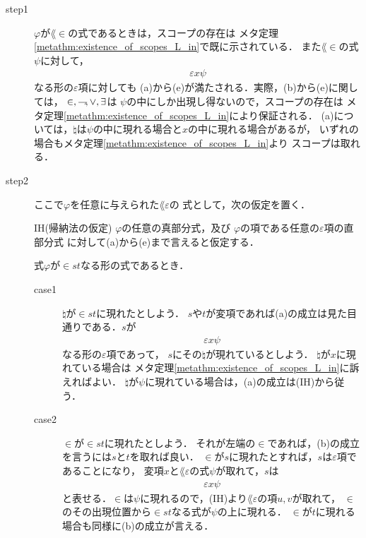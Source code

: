 	\begin{metaprf}\mbox{}
		\begin{description}
			\item[step1]
				$\varphi$が$\lang{\in}$の式であるときは，スコープの存在は
				メタ定理\ref{metathm:existence_of_scopes_L_in}で既に示されている．
				また$\lang{\in}$の式$\psi$に対して，
				\begin{align}
					\varepsilon x \psi
				\end{align}
				なる形の$\varepsilon$項に対しても
				(a)から(e)が満たされる．実際，(b)から(e)に関しては，
				$\in,\rightharpoondown\hspace{-0.25em},\vee,\exists$は
				$\psi$の中にしか出現し得ないので，スコープの存在は
				メタ定理\ref{metathm:existence_of_scopes_L_in}により保証される．
				(a)については，$\natural$は$\psi$の中に現れる場合と$x$の中に現れる場合があるが，
				いずれの場合もメタ定理\ref{metathm:existence_of_scopes_L_in}より
				スコープは取れる．
			
				
			\item[step2] ここで$\varphi$を任意に与えられた$\lang{\varepsilon}$の
				式として，次の仮定を置く．
				\begin{itembox}[l]{IH(帰納法の仮定)}
					$\varphi$の任意の真部分式，及び
					$\varphi$の項である任意の$\varepsilon$項の直部分式
					に対して(a)から(e)まで言えると仮定する．
				\end{itembox}
				
				式$\varphi$が$\in s t$なる形の式であるとき．
				\begin{description}
					\item[case1]
						$\natural$が$\in s t$に現れたとしよう．
						$s$や$t$が変項であれば(a)の成立は見た目通りである．$s$が
						\begin{align}
							\varepsilon x \psi
						\end{align}
						なる形の$\varepsilon$項であって，
						$s$にその$\natural$が現れているとしよう．
						$\natural$が$x$に現れている場合は
						メタ定理\ref{metathm:existence_of_scopes_L_in}に訴えればよい．
						$\natural$が$\psi$に現れている場合は，(a)の成立は(IH)から従う．
						
					\item[case2]
						$\in$が$\in s t$に現れたとしよう．
						それが左端の$\in$であれば，(b)の成立を言うには$s$と$t$を取れば良い．
						$\in$が$s$に現れたとすれば，$s$は$\varepsilon$項であることになり，
						変項$x$と$\lang{\varepsilon}$の式$\psi$が取れて，$s$は
						\begin{align}
							\varepsilon x \psi
						\end{align}
						と表せる．$\in$は$\psi$に現れるので，(IH)より$\lang{\varepsilon}$の項$u,v$が取れて，
						$\in$のその出現位置から$\in s t$なる式が$\psi$の上に現れる．
						$\in$が$t$に現れる場合も同様に(b)の成立が言える．
				

\end{description}
\end{description}
\end{metaprf}
